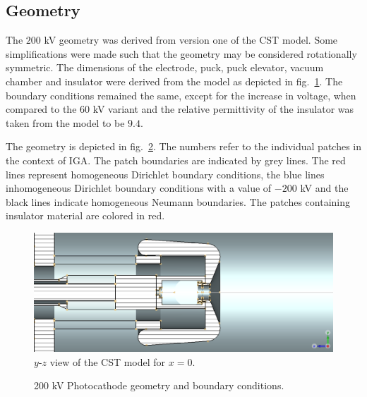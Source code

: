 \subsection{Geometry}
The $200$ kV geometry was derived from version one of the CST model. Some simplifications were made such that the geometry may be considered rotationally symmetric. The dimensions of the electrode, puck, puck elevator, vacuum chamber and insulator were derived from the model as depicted in fig.~\ref{fig:cst_geometry_yz}. The boundary conditions remained the same, except for the increase in voltage, when compared to the $60$ kV variant and the relative permittivity of the insulator was taken from the model to be $9.4$.

The geometry is depicted in fig.~\ref{fig:200kV_geometry}. The numbers refer to the individual patches in the context of IGA. The patch boundaries are indicated by grey lines. The red lines represent homogeneous Dirichlet boundary conditions, the blue lines inhomogeneous Dirichlet boundary conditions with a value of $-200$ kV and the black lines indicate homogeneous Neumann boundaries.
The patches containing insulator material are colored in red.

\begin{center}
\begin{figure}[H]
  \includegraphics[width=\textwidth]{figures/200kV/v1_cutx}
  \caption{$y$-$z$ view of the CST model for $x=0$.}
  \label{fig:cst_geometry_yz}
\end{figure}
\end{center}

\begin{center}
\begin{figure}[H]
  
  \caption{200 kV Photocathode geometry and boundary conditions.}
  \label{fig:200kV_geometry}
\end{figure}
\end{center}

